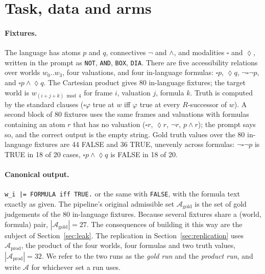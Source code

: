 \documentclass[11pt]{article}
\renewcommand{\Box}{\square}
\newcommand{\Dia}{\lozenge}
\begin{document}
\section{Task, data and arms}
\label{sec:setup}

\paragraph{Fixtures.} The language has atoms $p$ and $q$, connectives $\neg$ and $\wedge$, and modalities $\Box$ and $\Dia$, written in the prompt as \texttt{NOT}, \texttt{AND}, \texttt{BOX}, \texttt{DIA}. There are five accessibility relations over worlds $w_0..w_3$, four valuations, and four in-language formulas: $\Box p$, $\Dia q$, $\neg\Box\neg p$, and $\Box p \wedge \Dia q$. The Cartesian product gives 80 in-language fixtures; the target world is $w_{(i+j+k) \bmod 4}$ for frame $i$, valuation $j$, formula $k$. Truth is computed by the standard clauses ($\Box\varphi$ true at $w$ iff $\varphi$ true at every $R$-successor of $w$). A second block of 80 fixtures uses the same frames and valuations with formulas containing an atom $r$ that has no valuation ($\Box r$, $\Dia r$, $\neg r$, $p \wedge r$); the prompt says so, and the correct output is the empty string. Gold truth values over the 80 in-language fixtures are 44 FALSE and 36 TRUE, unevenly across formulas: $\neg\Box\neg p$ is TRUE in 18 of 20 cases, $\Box p \wedge \Dia q$ is FALSE in 18 of 20.

\paragraph{Canonical output.} \texttt{w\_i |= FORMULA iff TRUE.} or the same with \texttt{FALSE}, with the formula text exactly as given. The pipeline's original admissible set $\mathcal{A}_{\mathrm{gold}}$ is the set of gold judgements of the 80 in-language fixtures. Because several fixtures share a (world, formula) pair, $|\mathcal{A}_{\mathrm{gold}}| = 27$. The consequences of building it this way are the subject of Section~\ref{sec:leak}. The replication in Section~\ref{sec:replication} uses $\mathcal{A}_{\mathrm{prod}}$, the product of the four worlds, four formulas and two truth values, $|\mathcal{A}_{\mathrm{prod}}| = 32$. We refer to the two runs as the \emph{gold run} and the \emph{product run}, and write $\mathcal{A}$ for whichever set a run uses.
\end{document}
